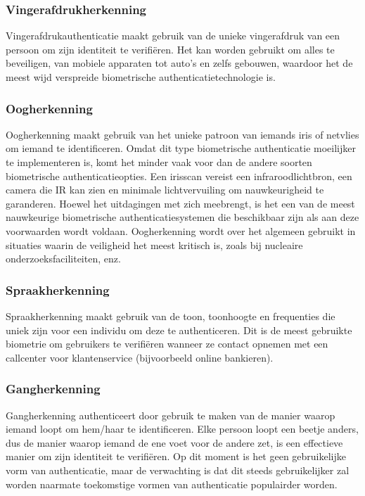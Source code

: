   \subsubsection{Vingerafdrukherkenning}%
  \label{subsubsec:vingerafdrukherkenning}
  Vingerafdrukauthenticatie maakt gebruik van de unieke vingerafdruk van een persoon om zijn identiteit te verifiëren. Het kan worden gebruikt om alles te beveiligen, van mobiele apparaten tot auto's en zelfs gebouwen, waardoor het de meest wijd verspreide biometrische authenticatietechnologie is.
  
  \subsubsection{Oogherkenning}%
  \label{subsubsec:oogherkenning}
  Oogherkenning maakt gebruik van het unieke patroon van iemands iris of netvlies om iemand te identificeren. Omdat dit type biometrische authenticatie moeilijker te implementeren is, komt het minder vaak voor dan de andere soorten biometrische authenticatieopties. Een irisscan vereist een infraroodlichtbron, een camera die IR kan zien en minimale lichtvervuiling om nauwkeurigheid te garanderen. Hoewel het uitdagingen met zich meebrengt, is het een van de meest nauwkeurige biometrische authenticatiesystemen die beschikbaar zijn als aan deze voorwaarden wordt voldaan. Oogherkenning wordt over het algemeen gebruikt in situaties waarin de veiligheid het meest kritisch is, zoals bij nucleaire onderzoeksfaciliteiten, enz.
  
  \subsubsection{Spraakherkenning}%
  \label{subsubsec:spraakherkenning}
  Spraakherkenning maakt gebruik van de toon, toonhoogte en frequenties die uniek zijn voor een individu om deze te authenticeren. Dit is de meest gebruikte biometrie om gebruikers te verifiëren wanneer ze contact opnemen met een callcenter voor klantenservice (bijvoorbeeld online bankieren).
  
  \subsubsection{Gangherkenning}%
  \label{subsubsec:gangherkenning}
  Gangherkenning authenticeert door gebruik te maken van de manier waarop iemand loopt om hem/haar te identificeren. Elke persoon loopt een beetje anders, dus de manier waarop iemand de ene voet voor de andere zet, is een effectieve manier om zijn identiteit te verifiëren. Op dit moment is het geen gebruikelijke vorm van authenticatie, maar de verwachting is dat dit steeds gebruikelijker zal worden naarmate toekomstige vormen van authenticatie populairder worden.
  
